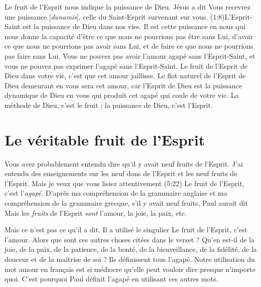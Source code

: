 \Og Le fruit de l'Esprit \Fg{} nous indique la puissance de Dieu.
 Jésus a dit\frcolon{} \Og Vous recevrez une puissance [\emph{dunamis}],
 celle du Saint-Esprit survenant sur vous. \Fg{}
 (1:8)L'Esprit-Saint est la puissance de Dieu dans nos vies.
 Il est cette puissance en nous qui nous donne la capacité
 d'être ce que nous ne pourrions pas être sans Lui,
 d'avoir ce que nous ne pourrions pas avoir sans Lui,
 et de faire ce que nous ne pourrions pas faire sans Lui.
 Vous ne pouvez pas avoir l'amour agapé sans l'Esprit-Saint,
 et vous ne pouvez pas exprimer l'agapé sans l'Esprit-Saint.
 Le fruit de l'Esprit de Dieu dans votre vie, c'est que cet amour jaillisse.
 Le flot naturel de l'Esprit de Dieu demeurant en vous sera cet amour,
 car l'Esprit de Dieu est la puissance dynamique de Dieu
 en vous qui produit cet agapé qui coule de votre vie.
 La méthode de Dieu, c'est le fruit ; la puissance de Dieu, c'est l'Esprit.


\section{Le v\'eritable fruit de l'Esprit}

Vous avez probablement entendu dire qu'il y avait neuf fruits de l'Esprit.
 J'ai entendu des enseignements sur les neuf dons de l'Esprit
 et les neuf fruits de l'Esprit. Mais je veux que vous lisiez
 attentivement (5:22)\frcolon{}
 \Og Le fruit de l'Esprit, c'est l'\emph{agapé}. \Fg{}
 D'après ma compréhension de la grammaire anglaise et
 ma compréhension de la grammaire grecque,
 s'il y avait neuf fruits, Paul aurait dit\frcolon{}
 \Og Mais les \emph{fruits} de l'Esprit \emph{sont} l'amour,
 la joie, la paix, etc. \Fg{}

Mais ce n'est pas ce qu'il a dit. Il a utilisé le singulier\frcolon{}
 \Og Le fruit de l'Esprit, c'est l'amour. \Fg{}
 Alors que sont ces autres choses citées dans le verset ?
 Qu'en est-il de la joie, de la paix, de la patience, de la bonté,
 de la bienveillance, de la fidélité, de la douceur
 et de la maîtrise de soi ? Ils définissent tous l'agapé.
 Notre utilisation du mot \Og amour \Fg{} en français est si médiocre
 qu'elle peut vouloir dire presque n'importe quoi.
 C'est pourquoi Paul définit l'agapé en utilisant ces autres mots.

